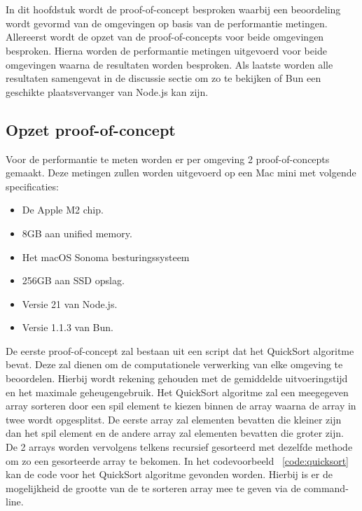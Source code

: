 \chapter{}%
\label{ch:proof-of-concept}

In dit hoofdstuk wordt de proof-of-concept besproken 
waarbij een beoordeling wordt gevormd van de omgevingen op basis van de performantie metingen.
Allereerst wordt de opzet van de proof-of-concepts voor beide omgevingen besproken.
Hierna worden de performantie metingen uitgevoerd voor beide omgevingen waarna de resultaten worden besproken.
Als laatste worden alle resultaten samengevat in de discussie sectie om zo te bekijken of Bun een geschikte plaatsvervanger
van Node.js kan zijn.

\section{Opzet proof-of-concept}
Voor de performantie te meten worden er per omgeving 2 proof-of-concepts gemaakt. 
Deze metingen zullen worden uitgevoerd op een Mac mini met volgende specificaties:
\begin{itemize}
  \item De Apple M2 chip.
  \item 8GB aan unified memory.
  \item Het macOS Sonoma besturingssysteem
  \item 256GB aan SSD opslag.
  \item Versie 21 van Node.js.
  \item Versie 1.1.3 van Bun.
\end{itemize}
De eerste proof-of-concept zal bestaan uit een script dat het QuickSort algoritme bevat. 
Deze zal dienen om de computationele verwerking van elke omgeving te beoordelen. 
Hierbij wordt rekening gehouden met de gemiddelde uitvoeringstijd en het maximale geheugengebruik.
Het QuickSort algoritme zal een meegegeven array sorteren door een spil element te kiezen binnen de array
waarna de array in twee wordt opgesplitst. De eerste array zal elementen bevatten die kleiner zijn dan het spil element 
en de andere array zal elementen bevatten die groter zijn. 
De 2 arrays worden vervolgens telkens recursief gesorteerd met dezelfde methode om zo een gesorteerde array te bekomen.
In het codevoorbeeld ~\ref{code:quicksort} kan de code voor het QuickSort algoritme gevonden worden.
Hierbij is er de mogelijkheid de grootte van de te sorteren array mee te geven via de command-line.


